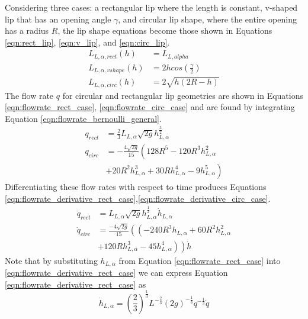 Considering three cases: a rectangular lip where the length is constant, v-shaped lip that has an opening angle $\gamma$, and circular lip shape, where the entire opening has a radius $R$, the lip shape equations become those shown in Equations \eqref{eqn:rect_lip}, \eqref{eqn:v_lip}, and \eqref{eqn:circ_lip}.
\begin{align}
L_{L,\alpha,rect}(h) &= L_{L,alpha} \label{eqn:rect_lip} \\
L_{L,\alpha,vshape}(h) &= 2h cos(\frac{\gamma}{2}) \label{eqn:v_lip} \\
L_{L,\alpha,circ}(h) &= 2 \sqrt{h(2R-h)} \label{eqn:circ_lip}
\end{align}
The flow rate $q$ for circular and rectangular lip geometries are shown in Equations \eqref{eqn:flowrate_rect_case}, \eqref{eqn:flowrate_circ_case} and are found by integrating Equation \eqref{eqn:flowrate_bernoulli_general}.
\begin{align}
q_{rect} &= \frac{2}{3} L_{L,\alpha} \sqrt{2g} h_{L,\alpha}^{\frac{3}{2}} \label{eqn:flowrate_rect_case} \\
q_{circ} &= - \frac{4\sqrt{2g}}{15}  \left(128 R^5 - 120 R^3 h_{L,\alpha}^2 \right. \nonumber \\ 
& \left. + 20R^2h_{L,\alpha}^3 + 30Rh_{L,\alpha}^4 - 9h_{L,\alpha}^5 \right) \label{eqn:flowrate_circ_case}  
\end{align}
Differentiating these flow rates with respect to time produces Equations \eqref{eqn:flowrate_derivative_rect_case},\eqref{eqn:flowrate_derivative_circ_case}.
\begin{align}
\dot{q}_{rect} &=  L_{L,\alpha} \sqrt{2g} h_{L,\alpha}^{\frac{1}{2}} \dot{h}_{L,\alpha} \label{eqn:flowrate_derivative_rect_case} \\
\dot{q}_{circ} &= \frac{ -4\sqrt{2g} }{15} \left(\left(-240R^3 h_{L,\alpha} + 60R^2 h_{L,\alpha}^2 \right. \right. \nonumber \\ 
& \left. \left. + 120 R h_{L,\alpha}^3 - 45 h_{L,\alpha}^4 \right) \right) \dot{h} \label{eqn:flowrate_derivative_circ_case} 
\end{align}
Note that by substituting $h_{L,\alpha}$ from Equation \eqref{eqn:flowrate_rect_case} into \eqref{eqn:flowrate_derivative_rect_case} we can express Equation \eqref{eqn:flowrate_derivative_rect_case} as 
\begin{equation}
\dot{h}_{L,\alpha} = \left( \frac{2}{3} \right)^{\frac{1}{3}} L^{-\frac{2}{3}} (2g)^{-\frac{1}{3}} q^{-\frac{1}{3}} \dot{q}
\label{eqn:hla_dot}
\end{equation}
